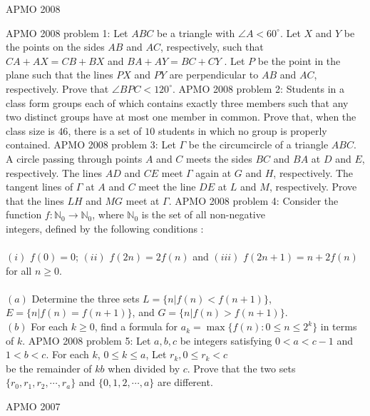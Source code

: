 APMO 2008 

APMO 2008 problem 1:  Let $ ABC$ be a triangle with $ \angle A < 60^\circ$. Let $ X$ and $ Y$ be the points on the sides $ AB$ and $ AC$, respectively, such that $ CA + AX = CB + BX$ and $ BA + AY = BC + CY$ . Let $ P$ be the point in the plane such that the lines $ PX$ and $ PY$ are perpendicular to $ AB$ and $ AC$, respectively. Prove that $ \angle BPC < 120^\circ$. 
APMO 2008 problem 2:  Students in a class form groups each of which contains exactly three members such that any two distinct groups have at most one member in common. Prove that, when the class size is $ 46$, there is a set of $ 10$ students in which no group is properly contained. 
APMO 2008 problem 3:  Let $ \Gamma$ be the circumcircle of a triangle $ ABC$. A circle passing through points $ A$ and $ C$ meets the sides $ BC$ and $ BA$ at $ D$ and $ E$, respectively. The lines $ AD$ and $ CE$ meet $ \Gamma$ again at $ G$ and $ H$, respectively. The tangent lines of $ \Gamma$ at $ A$ and $ C$ meet the line $ DE$ at $ L$ and $ M$, respectively. Prove that the lines $ LH$ and $ MG$ meet at $ \Gamma$. 
APMO 2008 problem 4:  Consider the function $ f: \mathbb{N}_0\to\mathbb{N}_0$, where $ \mathbb{N}_0$ is the set of all non-negative \\
integers, defined by the following conditions : \\\\
$ (i)$ $ f(0) = 0$; $ (ii)$ $ f(2n) = 2f(n)$ and $ (iii)$ $ f(2n + 1) = n + 2f(n)$ for all $ n\geq 0$. \\\\
$ (a)$ Determine the three sets $ L = \{ n | f(n) < f(n + 1) \}$, $ E = \{n | f(n) = f(n + 1) \}$, and $ G = \{n | f(n) > f(n + 1) \}$. \\
$ (b)$ For each $ k \geq 0$, find a formula for $ a_k = \max\{f(n) : 0 \leq n \leq 2^k\}$ in terms of $ k$. 
APMO 2008 problem 5:  Let $ a, b, c$ be integers satisfying $ 0 < a < c - 1$ and $ 1 < b < c$. For each $ k$, $ 0\leq k \leq a$, Let $ r_k,0 \leq r_k < c$ \\
be the remainder of $ kb$ when divided by $ c$. Prove that the two sets $ \{r_0, r_1, r_2, \cdots , r_a\}$ and $ \{0, 1, 2, \cdots , a\}$ are different. 

APMO 2007 

